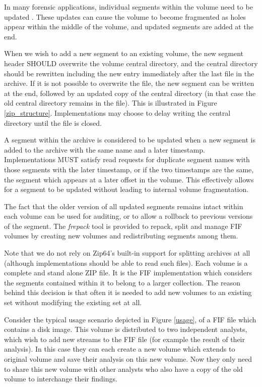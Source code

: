 \documentclass[10pt, conference]{IEEEtran}
\begin{document}
In many forensic applications, individual segments within the volume
need to be updated \cite{AFF}. These updates can cause the volume to
become fragmented as holes appear within the middle of the volume, and
updated segments are added at the end.

When we wish to add a new segment to an existing volume, the new
segment header SHOULD overwrite the volume central directory, and the
central directory should be rewritten including the new entry
immediately after the last file in the archive. If it is not possible
to overwrite the file, the new segment can be written at the end,
followed by an updated copy of the central directory (in that case the
old central directory remains in the file). This is illustrated in
Figure \ref{zip_structure}. Implementations may choose to delay
writing the central directory until the file is closed.

A segment within the archive is considered to be updated when a new
segment is added to the archive with the same name and a later
timestamp. Implementations MUST satisfy read requests for duplicate
segment names with those segments with the later timestamp, or if the
two timestamps are the same, the segment which appears at a later
offset in the volume. This effectively allows for a segment to be
updated without leading to internal volume fragmentation.

The fact that the older version of all updated segments remains intact
within each volume can be used for auditing, or to allow a rollback to
previous versions of the segment. The {\em frepack} tool is provided
to repack, split and manage FIF volumes by creating new volumes and
redistributing segments among them.

Note that we do not rely on Zip64's built-in support for splitting
archives at all (although implementations should be able to read such
files). Each volume is a complete and stand alone ZIP file. It is the
FIF implementation which considers the segments contained within it to
belong to a larger collection. The reason behind this decision is that
often it is needed to add new volumes to an existing set without
modifying the existing set at all.

Consider the typical usage scenario depicted in Figure \ref{usage}, of
a FIF file which contains a disk image. This volume is distributed to
two independent analysts, which wish to add new streams to the FIF
file (for example the result of their analysis). In this case they can
each create a new volume which extends to original volume and save
their analysis on this new volume. Now they only need to share this
new volume with other analysts who also have a copy of the old volume
to interchange their findings. 
\end{document}
